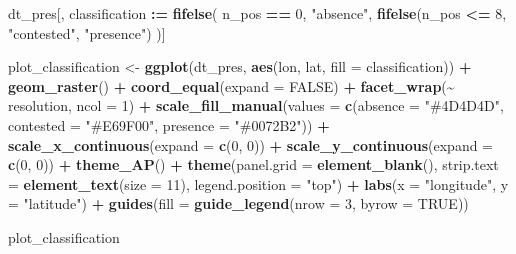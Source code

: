 \documentclass[
  11pt,
]{article}
\newenvironment{Shaded}{\begin{snugshade}}{\end{snugshade}}
\newcommand{\AttributeTok}[1]{\textcolor[rgb]{0.13,0.29,0.53}{#1}}
\newcommand{\ConstantTok}[1]{\textcolor[rgb]{0.56,0.35,0.01}{#1}}
\newcommand{\DecValTok}[1]{\textcolor[rgb]{0.00,0.00,0.81}{#1}}
\newcommand{\FunctionTok}[1]{\textcolor[rgb]{0.13,0.29,0.53}{\textbf{#1}}}
\newcommand{\NormalTok}[1]{#1}
\newcommand{\OtherTok}[1]{\textcolor[rgb]{0.56,0.35,0.01}{#1}}
\newcommand{\SpecialCharTok}[1]{\textcolor[rgb]{0.81,0.36,0.00}{\textbf{#1}}}
\newcommand{\StringTok}[1]{\textcolor[rgb]{0.31,0.60,0.02}{#1}}
\begin{document}
\begin{Shaded}
\begin{Highlighting}[]
\NormalTok{dt\_pres[, classification }\SpecialCharTok{:=} \FunctionTok{fifelse}\NormalTok{(}
\NormalTok{  n\_pos }\SpecialCharTok{==} \DecValTok{0}\NormalTok{, }\StringTok{"absence"}\NormalTok{,}
  \FunctionTok{fifelse}\NormalTok{(n\_pos }\SpecialCharTok{\textless{}=} \DecValTok{8}\NormalTok{, }\StringTok{"contested"}\NormalTok{, }\StringTok{"presence"}\NormalTok{)}
\NormalTok{)]}

\NormalTok{plot\_classification }\OtherTok{\textless{}{-}} \FunctionTok{ggplot}\NormalTok{(dt\_pres, }\FunctionTok{aes}\NormalTok{(lon, lat, }\AttributeTok{fill =}\NormalTok{ classification)) }\SpecialCharTok{+}
  \FunctionTok{geom\_raster}\NormalTok{() }\SpecialCharTok{+}
  \FunctionTok{coord\_equal}\NormalTok{(}\AttributeTok{expand =} \ConstantTok{FALSE}\NormalTok{) }\SpecialCharTok{+}
  \FunctionTok{facet\_wrap}\NormalTok{(}\SpecialCharTok{\textasciitilde{}}\NormalTok{ resolution, }\AttributeTok{ncol =} \DecValTok{1}\NormalTok{) }\SpecialCharTok{+}
  \FunctionTok{scale\_fill\_manual}\NormalTok{(}\AttributeTok{values =} \FunctionTok{c}\NormalTok{(}\AttributeTok{absence =} \StringTok{"\#4D4D4D"}\NormalTok{, }
                               \AttributeTok{contested =} \StringTok{"\#E69F00"}\NormalTok{, }
                               \AttributeTok{presence =} \StringTok{"\#0072B2"}\NormalTok{)) }\SpecialCharTok{+}
  \FunctionTok{scale\_x\_continuous}\NormalTok{(}\AttributeTok{expand =} \FunctionTok{c}\NormalTok{(}\DecValTok{0}\NormalTok{, }\DecValTok{0}\NormalTok{)) }\SpecialCharTok{+}
  \FunctionTok{scale\_y\_continuous}\NormalTok{(}\AttributeTok{expand =} \FunctionTok{c}\NormalTok{(}\DecValTok{0}\NormalTok{, }\DecValTok{0}\NormalTok{)) }\SpecialCharTok{+}
  \FunctionTok{theme\_AP}\NormalTok{() }\SpecialCharTok{+}
  \FunctionTok{theme}\NormalTok{(}\AttributeTok{panel.grid =} \FunctionTok{element\_blank}\NormalTok{(),}
        \AttributeTok{strip.text =} \FunctionTok{element\_text}\NormalTok{(}\AttributeTok{size =} \DecValTok{11}\NormalTok{),}
        \AttributeTok{legend.position =} \StringTok{"top"}\NormalTok{) }\SpecialCharTok{+}
  \FunctionTok{labs}\NormalTok{(}\AttributeTok{x =} \StringTok{"longitude"}\NormalTok{, }\AttributeTok{y =} \StringTok{"latitude"}\NormalTok{) }\SpecialCharTok{+}
  \FunctionTok{guides}\NormalTok{(}\AttributeTok{fill =} \FunctionTok{guide\_legend}\NormalTok{(}\AttributeTok{nrow =} \DecValTok{3}\NormalTok{, }\AttributeTok{byrow =} \ConstantTok{TRUE}\NormalTok{))}

\NormalTok{plot\_classification}
\end{Highlighting}
\end{Shaded}
\end{document}
